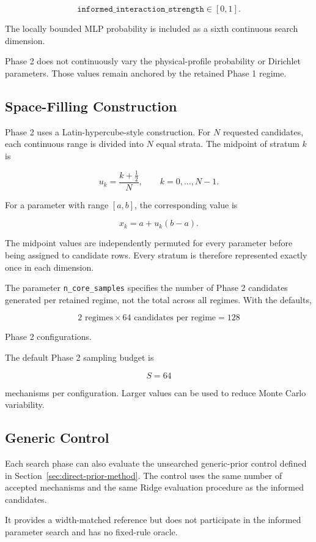 \documentclass{article}
\begin{document}
\[
\texttt{informed\_interaction\_strength}
\in
[0,1].
\]

The locally bounded MLP probability is included as a sixth continuous search dimension.

Phase 2 does not continuously vary the physical-profile probability or Dirichlet parameters. Those values remain anchored by the retained Phase 1 regime.

\subsection{Space-Filling Construction}

Phase 2 uses a Latin-hypercube-style construction. For \(N\) requested candidates, each continuous range is divided into \(N\) equal strata. The midpoint of stratum \(k\) is

\[
u_k
=
\frac{k+\tfrac{1}{2}}{N},
\qquad
k=0,\ldots,N-1.
\]

For a parameter with range \([a,b]\), the corresponding value is

\[
x_k=a+u_k(b-a).
\]

The midpoint values are independently permuted for every parameter before being assigned to candidate rows. Every stratum is therefore represented exactly once in each dimension.

The parameter \texttt{n\_core\_samples} specifies the number of Phase 2 candidates generated per retained regime, not the total across all regimes. With the defaults,

\[
2 \text{ regimes}
\times
64 \text{ candidates per regime}
=
128
\]

Phase 2 configurations.

The default Phase 2 sampling budget is

\[
S=64
\]

mechanisms per configuration. Larger values can be used to reduce Monte Carlo variability.

\subsection{Generic Control}

Each search phase can also evaluate the unsearched generic-prior control defined in Section~\ref{sec:direct-prior-method}. The control uses the same number of accepted mechanisms and the same Ridge evaluation procedure as the informed candidates.

It provides a width-matched reference but does not participate in the informed parameter search and has no fixed-rule oracle.
\end{document}
